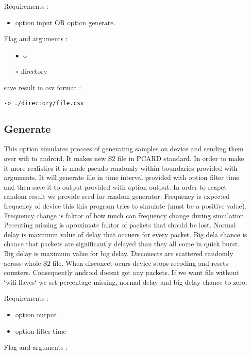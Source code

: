 \documentclass[english]{article}
\begin{document}
\noindent Requirements : 
\begin{itemize}
\item option input OR option generate. 
\end{itemize}
Flag and arguments :
\begin{itemize}
\item[$\bullet$] -o
\item[$\circ$] directory
\end{itemize}
save result in csv format : 
\begin{lstlisting} 
-o ./directory/file.csv
\end{lstlisting}


\subsection{Generate}
This option simulates procces of generating samples on device and sending them over wifi to android. It makes new S2 file in PCARD standard. In order to make it more realistics it is made pseudo-randomly within boundaries provided with arguments. It will generate file in time interval provided with option filter time and then save it to output provided with option output. In order to reapet random result we provide seed for random generator. Frequency is expected frequency of device this this program tries to simulate (must be a positive value). Frequency change is faktor of how much can frequency change during simulation. Pecenting missing is aproximate faktor of packets that should be lost. Normal delay is maximum value of delay that occuers for every packet. Big dela chance is chance that packets are significantly delayed than they all come in quick burst. Big delay is maximum value for big delay. Disconects are scattered randomly across whole S2 file. When disconect ocurs device stops recoding and resets counters. Consequently android doesnt get any packets. If we want file without `wifi-flaves` we set percentage missing, normal delay and big delay chance to zero. 

\noindent Requirements : 
\begin{itemize}
\item option output
\item option filter time
\end{itemize}
Flag and arguments :
\end{document}
